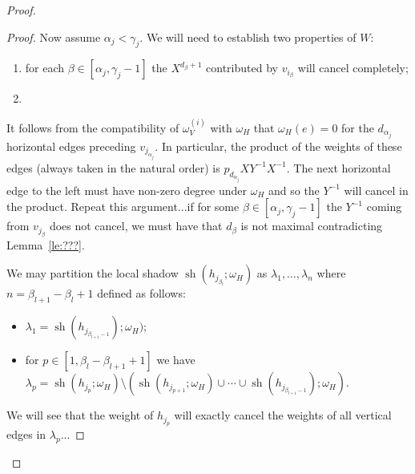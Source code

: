\documentclass{amsart}
\newcommand{\sh}{\operatorname{sh}}
\begin{document}
\begin{proof}
\begin{proof}
   Now assume $\alpha_j<\gamma_j$.  We will need to establish two properties of $W$:
   \begin{enumerate}
    \item for each $\beta\in[\alpha_j,\gamma_j-1]$ the $X^{d_\beta+1}$ contributed by $v_{i_\beta}$ will cancel completely;
    \item 
   \end{enumerate}

   It follows from the compatibility of $\omega_V^{(i)}$ with $\omega_H$ that $\omega_H(e)=0$ for the $d_{\alpha_j}$ horizontal edges preceding $v_{j_{\alpha_j}}$.  In particular, the product of the weights of these edges (always taken in the natural order) is $p_{d_{\alpha_j}}XY^{-1}X^{-1}$.  The next horizontal edge to the left must have non-zero degree under $\omega_H$ and so the $Y^{-1}$ will cancel in the product.  Repeat this argument...if for some $\beta\in[\alpha_j,\gamma_j-1]$ the $Y^{-1}$ coming from $v_{j_\beta}$ does not cancel, we must have that $d_\beta$ is not maximal contradicting Lemma~\ref{le:???}.

   We may partition the local shadow $\sh(h_{j_{\beta_l}};\omega_H)$ as $\lambda_1,\ldots,\lambda_n$ where $n=\beta_{l+1}-\beta_l+1$ defined as follows:
   \begin{itemize}
    \item $\lambda_1=\sh(h_{j_{\beta_{l+1}-1}});\omega_H)$;
    \item for $p\in[1,\beta_l-\beta_{l+1}+1]$ we have $\lambda_p=\sh(h_{j_p};\omega_H)\setminus (\sh(h_{j_{p+1}};\omega_H)\cup\cdots\cup\sh(h_{j_{\beta_{l+1}-1}});\omega_H)$.
   \end{itemize}
   We will see that the weight of $h_{j_p}$ will exactly cancel the weights of all vertical edges in $\lambda_p$...

  \end{proof}
 \end{proof}

  
  
\end{document}
